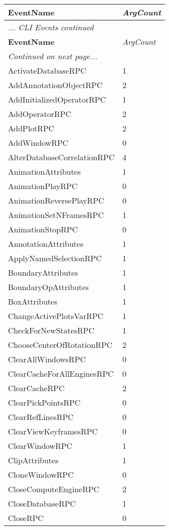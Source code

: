 \documentclass[10pt,a4paper]{report}
\begin{document}
\begin{longtable}{ll}
{\bf EventName} & {\it ArgCount } \\
\hline \hline
\endfirsthead
\multicolumn{2}{l}{{\it ... CLI Events continued }} \\
{\bf EventName} & {\it ArgCount } \\
\hline \hline
\endhead
\multicolumn{2}{l}{{\it Continued on next page...}} \\
\endfoot
\hline
\endlastfoot

ActivateDatabaseRPC & 1 \\
AddAnnotationObjectRPC & 2 \\
AddInitializedOperatorRPC & 1 \\
AddOperatorRPC & 2 \\
AddPlotRPC & 2 \\
AddWindowRPC & 0 \\
AlterDatabaseCorrelationRPC & 4 \\
AnimationAttributes & 1 \\
AnimationPlayRPC & 0 \\
AnimationReversePlayRPC & 0 \\
AnimationSetNFramesRPC & 1 \\
AnimationStopRPC & 0 \\
AnnotationAttributes & 1 \\
ApplyNamedSelectionRPC & 1 \\
BoundaryAttributes & 1 \\
BoundaryOpAttributes & 1 \\
BoxAttributes & 1 \\
ChangeActivePlotsVarRPC & 1 \\
CheckForNewStatesRPC & 1 \\
ChooseCenterOfRotationRPC & 2 \\
ClearAllWindowsRPC & 0 \\
ClearCacheForAllEnginesRPC & 0 \\
ClearCacheRPC & 2 \\
ClearPickPointsRPC & 0 \\
ClearRefLinesRPC & 0 \\
ClearViewKeyframesRPC & 0 \\
ClearWindowRPC & 1 \\
ClipAttributes & 1 \\
CloneWindowRPC & 0 \\
CloseComputeEngineRPC & 2 \\
CloseDatabaseRPC & 1 \\
CloseRPC & 0 \\

\end{longtable}
\end{document}
